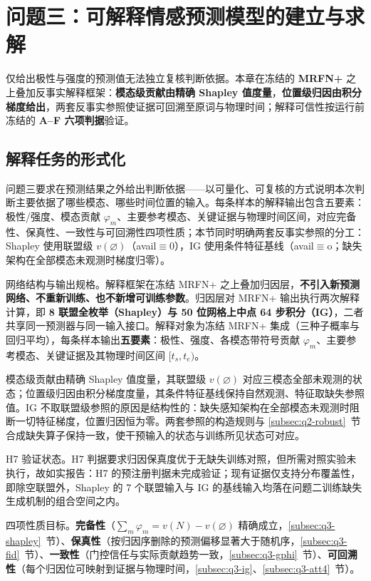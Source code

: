 \documentclass[colorprint,nocoverzero]{gmcmthesis}
\begin{document}
\clearpage
\section{问题三：可解释情感预测模型的建立与求解}
仅给出极性与强度的预测值无法独立复核判断依据。本章在冻结的 \textbf{MRFN+} 之上叠加反事实解释框架：\textbf{模态级贡献由精确 Shapley 值度量}，\textbf{位置级归因由积分梯度给出}，两套反事实参照使证据可回溯至原词与物理时间；解释可信性按运行前冻结的 \textbf{A--F 六项判据}验证。



\subsection{解释任务的形式化}\label{subsec:q3-task}
问题三要求在预测结果之外给出判断依据——以可量化、可复核的方式说明本次判断主要依据了哪些模态、哪些时间位置的输入。每条样本的解释输出包含五要素：极性/强度、模态贡献 $\varphi_m$、主要参考模态、关键证据与物理时间区间，对应完备性、保真性、一致性与可回溯性四项性质；本节同时明确两套反事实参照的分工：Shapley 使用联盟级 $v(\varnothing)$（avail$\equiv$0），IG 使用条件特征基线（avail$\equiv$o；缺失架构在全部模态未观测时梯度归零）。

网络结构与输出规格。解释框架在冻结 MRFN+ 之上叠加归因层，\textbf{不引入新预测网络、不重新训练、也不新增可训练参数}。归因层对 MRFN+ 输出执行两次解释计算，即 \textbf{8 联盟全枚举（Shapley）与 50 位网格上中点 64 步积分（IG）}，二者共享同一预测器与同一输入接口。解释对象为冻结 MRFN+ 集成（三种子概率与回归平均），每条样本输出\textbf{五要素}：极性、强度、各模态带符号贡献 $\varphi_m$、主要参考模态、关键证据及其物理时间区间 $[t_s,t_e)$。

模态级贡献由精确 Shapley 值度量\cite[pp.~307--317]{shapley1953value}，其联盟级 $v(\varnothing)$ 对应三模态全部未观测的状态；位置级归因由积分梯度度量\cite{sundararajan2017ig}，其条件特征基线保持自然观测、特征取缺失参照值。IG 不取联盟级参照的原因是结构性的：缺失感知架构在全部模态未观测时阻断一切特征梯度，位置归因恒为零。两套参照的构造规则与 \ref{subsec:q2-robust}~节合成缺失算子保持一致，使干预输入的状态与训练所见状态可对应。

H7 验证状态。H7 判据要求归因保真度优于无缺失训练对照，但所需对照实验未执行，故如实报告：H7 的预注册判据未完成验证；现有证据仅支持分布覆盖性，即除空联盟外，Shapley 的 7 个联盟输入与 IG 的基线输入均落在问题二训练缺失生成机制的组合空间之内。

四项性质目标。\textbf{完备性}（$\sum_m\varphi_m=v(N)-v(\varnothing)$ 精确成立，\ref{subsec:q3-shapley}~节）、\textbf{保真性}（按归因序删除的预测偏移显著大于随机序，\ref{subsec:q3-fid}~节）、\textbf{一致性}（门控信任与实际贡献趋势一致，\ref{subsec:q3-gphi}~节）、\textbf{可回溯性}（每个归因位可映射到证据与物理时间，\ref{subsec:q3-ig}、\ref{subsec:q3-att4}~节）。
\end{document}

